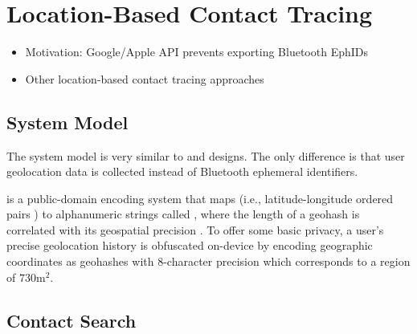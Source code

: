 \section{Location-Based Contact Tracing}\label{sec:location-based}
\begin{itemize}
  \item Motivation: Google/Apple API prevents exporting Bluetooth EphIDs
  \item Other location-based contact tracing approaches
\end{itemize}
\subsection{System Model}
The system model is very similar to \citet{Ayday2020, Ayday2021} and designs. The only difference is that user geolocation data is collected instead of Bluetooth ephemeral identifiers.

 is a public-domain encoding system that maps  (i.e., latitude-longitude ordered pairs \cite[p. 5]{Sickle2004}) to alphanumeric strings called , where the length of a geohash is correlated with its geospatial precision \citep{Morton1966}. To offer some basic privacy, a user's precise geolocation history is obfuscated on-device by encoding geographic coordinates as geohashes with 8-character precision which corresponds to a region of $730\mathrm{m}^2$.

\subsection{Contact Search}

\newcommand{\histories}{\vSet{H}}
\newcommand{\locations}{\mathbb{L}}
\newcommand{\locset}{\vSet{L}}
\newcommand{\latitude}{\phi}
\newcommand{\longitude}{\lambda}
\newcommand{\users}{\vSet{U}}
\newcommand{\sindex}{\vSet{I}}
\newcommand{\query}{\vSet{N}}
\newcommand{\qelement}{q}
\newcommand{\hone}{G}
\newcommand{\htwo}{H}
\newcommand{\neighbors}{\vSet{N}}

